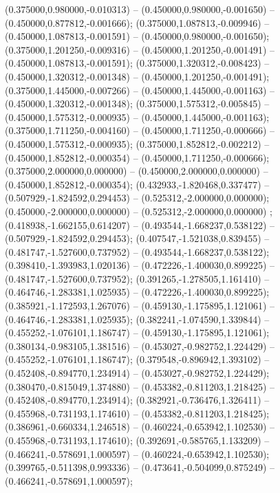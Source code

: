  (0.375000,0.980000,-0.010313) -- (0.450000,0.980000,-0.001650) -- (0.450000,0.877812,-0.001666);
 (0.375000,1.087813,-0.009946) -- (0.450000,1.087813,-0.001591) -- (0.450000,0.980000,-0.001650);
 (0.375000,1.201250,-0.009316) -- (0.450000,1.201250,-0.001491) -- (0.450000,1.087813,-0.001591);
 (0.375000,1.320312,-0.008423) -- (0.450000,1.320312,-0.001348) -- (0.450000,1.201250,-0.001491);
 (0.375000,1.445000,-0.007266) -- (0.450000,1.445000,-0.001163) -- (0.450000,1.320312,-0.001348);
 (0.375000,1.575312,-0.005845) -- (0.450000,1.575312,-0.000935) -- (0.450000,1.445000,-0.001163);
 (0.375000,1.711250,-0.004160) -- (0.450000,1.711250,-0.000666) -- (0.450000,1.575312,-0.000935);
 (0.375000,1.852812,-0.002212) -- (0.450000,1.852812,-0.000354) -- (0.450000,1.711250,-0.000666);
 (0.375000,2.000000,0.000000) -- (0.450000,2.000000,0.000000) -- (0.450000,1.852812,-0.000354);
 (0.432933,-1.820468,0.337477) -- (0.507929,-1.824592,0.294453) -- (0.525312,-2.000000,0.000000);
 (0.450000,-2.000000,0.000000) -- (0.525312,-2.000000,0.000000) ;
 (0.418938,-1.662155,0.614207) -- (0.493544,-1.668237,0.538122) -- (0.507929,-1.824592,0.294453);
 (0.407547,-1.521038,0.839455) -- (0.481747,-1.527600,0.737952) -- (0.493544,-1.668237,0.538122);
 (0.398410,-1.393983,1.020136) -- (0.472226,-1.400030,0.899225) -- (0.481747,-1.527600,0.737952);
 (0.391265,-1.278505,1.161410) -- (0.464746,-1.283381,1.025935) -- (0.472226,-1.400030,0.899225);
 (0.385921,-1.172593,1.267076) -- (0.459130,-1.175895,1.121061) -- (0.464746,-1.283381,1.025935);
 (0.382241,-1.074590,1.339844) -- (0.455252,-1.076101,1.186747) -- (0.459130,-1.175895,1.121061);
 (0.380134,-0.983105,1.381516) -- (0.453027,-0.982752,1.224429) -- (0.455252,-1.076101,1.186747);
 (0.379548,-0.896942,1.393102) -- (0.452408,-0.894770,1.234914) -- (0.453027,-0.982752,1.224429);
 (0.380470,-0.815049,1.374880) -- (0.453382,-0.811203,1.218425) -- (0.452408,-0.894770,1.234914);
 (0.382921,-0.736476,1.326411) -- (0.455968,-0.731193,1.174610) -- (0.453382,-0.811203,1.218425);
 (0.386961,-0.660334,1.246518) -- (0.460224,-0.653942,1.102530) -- (0.455968,-0.731193,1.174610);
 (0.392691,-0.585765,1.133209) -- (0.466241,-0.578691,1.000597) -- (0.460224,-0.653942,1.102530);
 (0.399765,-0.511398,0.993336) -- (0.473641,-0.504099,0.875249) -- (0.466241,-0.578691,1.000597);
